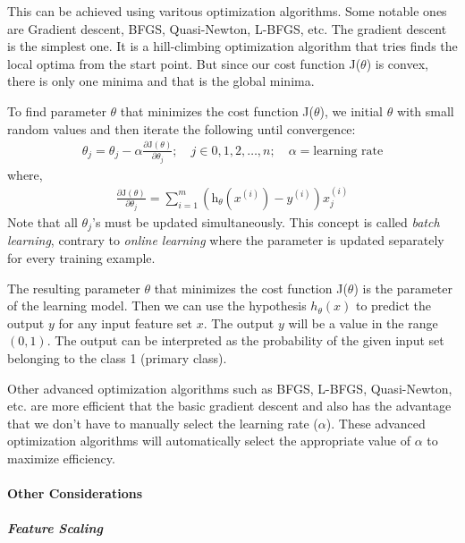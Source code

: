 This can be achieved using varitous optimization algorithms. Some notable
ones are Gradient descent, BFGS, Quasi-Newton, L-BFGS, etc. The gradient
descent is the simplest one. It is a hill-climbing optimization algorithm
that tries finds the local optima from the start point. But since our
cost function J($\theta$) is convex, there is only one minima and that is the
global minima.

To find parameter $\theta$ that minimizes the cost function J($\theta$),
we initial $\theta$ with small random values and then
iterate the following until convergence:
\begin{align}
  \theta_j = \theta_j - \alpha \frac{\partial \text{J}(\theta)}{\partial \theta_j};
  \quad j \in {0,1,2,\ldots,n}; \quad \alpha = \text{learning rate}
  \nonumber
\end{align}
where,
\begin{align}
  \frac{\partial \text{J}(\theta)}{\partial \theta_j} =
  \sum_{i=1}^{m} \left( \text{h}_\theta \left(x^{(i)}\right) - y^{(i)} \right) x^{(i)}_j
\end{align}
Note that all $\theta_j$'s must be updated simultaneously. This concept is called
{\em batch learning}, contrary to {\em online learning} where the parameter is updated
separately for every training example.

The resulting parameter $\theta$ that minimizes the cost function J($\theta$) is
the parameter of the learning model. Then we can use the hypothesis $h_\theta(x)$
to predict the output $y$ for any input feature set $x$. The output $y$ will be
a value in the range $(0,1)$. The output can be interpreted as the probability
of the given input set belonging to the class 1 (primary class).

Other advanced optimization algorithms such as BFGS, L-BFGS, Quasi-Newton, etc.
are more efficient that the basic gradient descent and also has the advantage that
we don't have to manually select the learning rate ($\alpha$). These advanced
optimization algorithms will automatically select the appropriate value of $\alpha$
to maximize efficiency.

\paragraph{Other Considerations}\hfill


\subparagraph{Feature Scaling}\hfill

